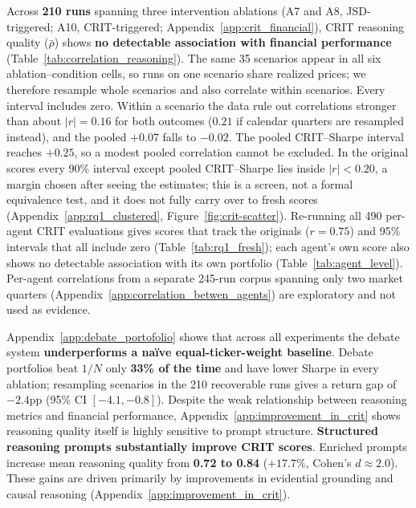 \documentclass{article}
\begin{document}
Across \textbf{210 runs} spanning three intervention ablations (A7 and A8, JSD-triggered; A10, CRIT-triggered; Appendix~\ref{app:crit_financial}), CRIT reasoning quality ($\bar{\rho}$) shows \textbf{no detectable association with financial performance} (Table~\ref{tab:correlation_reasoning}). The same 35 scenarios appear in all six ablation--condition cells, so runs on one scenario share realized prices; we therefore resample whole scenarios and also correlate within scenarios. Every interval includes zero. Within a scenario the data rule out correlations stronger than about $|r|{=}0.16$ for both outcomes ($0.21$ if calendar quarters are resampled instead), and the pooled $+0.07$ falls to $-0.02$. The pooled CRIT--Sharpe interval reaches $+0.25$, so a modest pooled correlation cannot be excluded. In the original scores every 90\% interval except pooled CRIT--Sharpe lies inside $|r|{<}0.20$, a margin chosen after seeing the estimates; this is a screen, not a formal equivalence test, and it does not fully carry over to fresh scores (Appendix~\ref{app:rq1_clustered}, Figure~\ref{fig:crit-scatter}). Re-running all 490 per-agent CRIT evaluations gives scores that track the originals ($r{=}0.75$) and 95\% intervals that all include zero (Table~\ref{tab:rq1_fresh}); each agent's own score also shows no detectable association with its own portfolio (Table~\ref{tab:agent_level}). Per-agent correlations from a separate 245-run corpus spanning only two market quarters (Appendix~\ref{app:correlation_betwen_agents}) are exploratory and not used as evidence.

Appendix~\ref{app:debate_portofolio} shows that across all experiments the debate system \textbf{underperforms a naïve equal-ticker-weight baseline}. Debate portfolios beat $1/N$ only \textbf{33\% of the time} and have lower Sharpe in every ablation; resampling scenarios in the 210 recoverable runs gives a return gap of $-2.4$pp (95\% CI $[-4.1,-0.8]$).  Despite the weak relationship between reasoning metrics and financial performance, Appendix~\ref{app:improvement_in_crit} shows reasoning quality itself is highly sensitive to prompt structure. \textbf{Structured reasoning prompts substantially improve CRIT scores}. Enriched prompts increase mean reasoning quality from \textbf{0.72 to 0.84} ($+17.7\%$, Cohen’s $d \approx 2.0$). These gains are driven primarily by improvements in evidential grounding and causal reasoning (Appendix~\ref{app:improvement_in_crit}).
\end{document}
